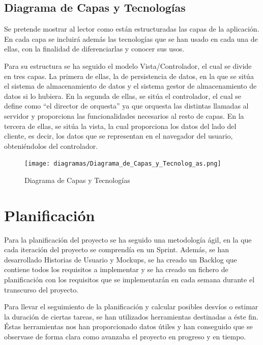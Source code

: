 \documentclass[11pt,openany]{book}
\begin{document}
\section{Diagrama de Capas y Tecnologías}

Se pretende mostrar al lector como están estructuradas las capas de la aplicación. En cada capa se incluirá además las tecnologías que se han usado en cada una de ellas, con la finalidad de diferenciarlas y conocer sus usos.

Para su estructura se ha seguido el modelo Vista/Controlador, el cual se divide en tres capas. La primera de ellas, la de persistencia de datos, en la que se sitúa el sistema de almacenamiento de datos y el sistema gestor de almacenamiento de datos si lo hubiera. En la segunda de ellas, se sitúa el controlador, el cual se define como ``el director de orquesta'' ya que orquesta las distintas llamadas al servidor y proporciona las funcionalidades necesarios al resto de capas. En la tercera de ellas, se sitúa la vista, la cual proporciona los datos del lado del cliente, es decir, los datos que se representan en el navegador del usuario, obteniéndolos del controlador.

\begin{figure}[H]
\centering
\texttt{[image: diagramas/Diagrama\_de\_Capas\_y\_Tecnolog\_as.png]}
\caption{Diagrama de Capas y Tecnologías}
\end{figure}

\chapter{Planificación}

Para la planificación del proyecto se ha seguido una metodología ágil, en la que cada iteración del proyecto se comprendía en un Sprint. Además, se han desarrollado Historias de Usuario y Mockups, se ha creado un Backlog que contiene todos los requisitos a implementar y se ha creado un fichero de planificación con los requisitos que se implementarán en cada semana durante el transcurso del proyecto.

Para llevar el seguimiento de la planificación y calcular posibles desvíos o estimar la duración de ciertas tareas, se han utilizados herramientas destinadas a éste fin. Éstas herramientas nos han proporcionado datos útiles y han conseguido que se observase de forma clara como avanzaba el proyecto en progreso y en tiempo.
\end{document}
